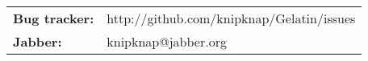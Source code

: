 \begin{tabular}{ll}
{\bf Bug tracker:}   & http://github.com/knipknap/Gelatin/issues \\
{\bf Jabber:}        & knipknap@jabber.org
\end{tabular}

